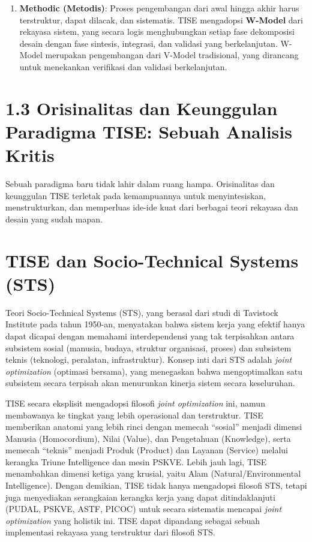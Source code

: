 \documentclass[
  letterpaper,
  DIV=11,
  numbers=noendperiod]{scrreprt}
\begin{document}
\begin{enumerate}
{  System, Technology, Fundamental Research)} untuk memecah masalah besar
  menjadi lapisan-lapisan yang lebih kecil dan dapat dikelola, dari
  penelitian fundamental hingga aplikasi di dunia nyata.
\item
  \textbf{Methodic (Metodis)}: Proses pengembangan dari awal hingga
  akhir harus terstruktur, dapat dilacak, dan sistematis. TISE
  mengadopsi \textbf{W-Model} dari rekayasa sistem, yang secara logis
  menghubungkan setiap fase dekomposisi desain dengan fase sintesis,
  integrasi, dan validasi yang berkelanjutan. W-Model merupakan
  pengembangan dari V-Model tradisional, yang dirancang untuk menekankan
  verifikasi dan validasi berkelanjutan.
\end{enumerate}

\section{\texorpdfstring{\textbf{1.3 Orisinalitas dan Keunggulan
Paradigma TISE: Sebuah Analisis
Kritis}}{1.3 Orisinalitas dan Keunggulan Paradigma TISE: Sebuah Analisis Kritis}}\label{orisinalitas-dan-keunggulan-paradigma-tise-sebuah-analisis-kritis}

Sebuah paradigma baru tidak lahir dalam ruang hampa. Orisinalitas dan
keunggulan TISE terletak pada kemampuannya untuk menyintesiskan,
menstrukturkan, dan memperluas ide-ide kuat dari berbagai teori rekayasa
dan desain yang sudah mapan.

\section{\texorpdfstring{\textbf{TISE dan Socio-Technical Systems
(STS)}}{TISE dan Socio-Technical Systems (STS)}}\label{tise-dan-socio-technical-systems-sts}

Teori Socio-Technical Systems (STS), yang berasal dari studi di
Tavistock Institute pada tahun 1950-an, menyatakan bahwa sistem kerja
yang efektif hanya dapat dicapai dengan memahami interdependensi yang
tak terpisahkan antara subsistem sosial (manusia, budaya, struktur
organisasi, proses) dan subsistem teknis (teknologi, peralatan,
infrastruktur). Konsep inti dari STS adalah \emph{joint optimization}
(optimasi bersama), yang menegaskan bahwa mengoptimalkan satu subsistem
secara terpisah akan menurunkan kinerja sistem secara keseluruhan.

TISE secara eksplisit mengadopsi filosofi \emph{joint optimization} ini,
namun membawanya ke tingkat yang lebih operasional dan terstruktur. TISE
memberikan anatomi yang lebih rinci dengan memecah ``sosial'' menjadi
dimensi Manusia (Homocordium), Nilai (Value), dan Pengetahuan
(Knowledge), serta memecah ``teknis'' menjadi Produk (Product) dan
Layanan (Service) melalui kerangka Triune Intelligence dan mesin PSKVE.
Lebih jauh lagi, TISE menambahkan dimensi ketiga yang krusial, yaitu
Alam (Natural/Environmental Intelligence). Dengan demikian, TISE tidak
hanya mengadopsi filosofi STS, tetapi juga menyediakan serangkaian
kerangka kerja yang dapat ditindaklanjuti (PUDAL, PSKVE, ASTF, PICOC)
untuk secara sistematis mencapai \emph{joint optimization} yang holistik
ini. TISE dapat dipandang sebagai sebuah implementasi rekayasa yang
terstruktur dari filosofi STS.
\end{document}

